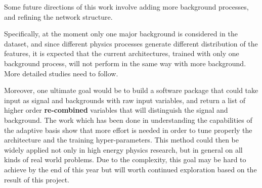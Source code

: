 \documentclass{article}
\begin{document}
Some future directions of this work involve adding more background processes, and refining the network structure.

Specifically, at the moment only one major background is considered in the dataset, and since different physics processes generate different distribution of the features, it is expected that the current architectures, trained with only one background process, will not perform in the same way with more background. More detailed studies need to follow.

Moreover, one ultimate goal would be to build a software package that could take input as signal and backgrounds with raw input variables, and return a list of higher order \textbf{re-combined} variables that will distinguish the signal and background. 
The work which has been done in understanding the capabilities of the adaptive basis show that more effort is needed in order to tune properly the architecture and the training hyper-parameters.
This method could then be widely applied not only in high energy physics research, but in general on all kinds of real world problems. Due to the complexity, this goal may be hard to achieve by the end of this year but will worth continued exploration based on the result of this project.







\end{document}
